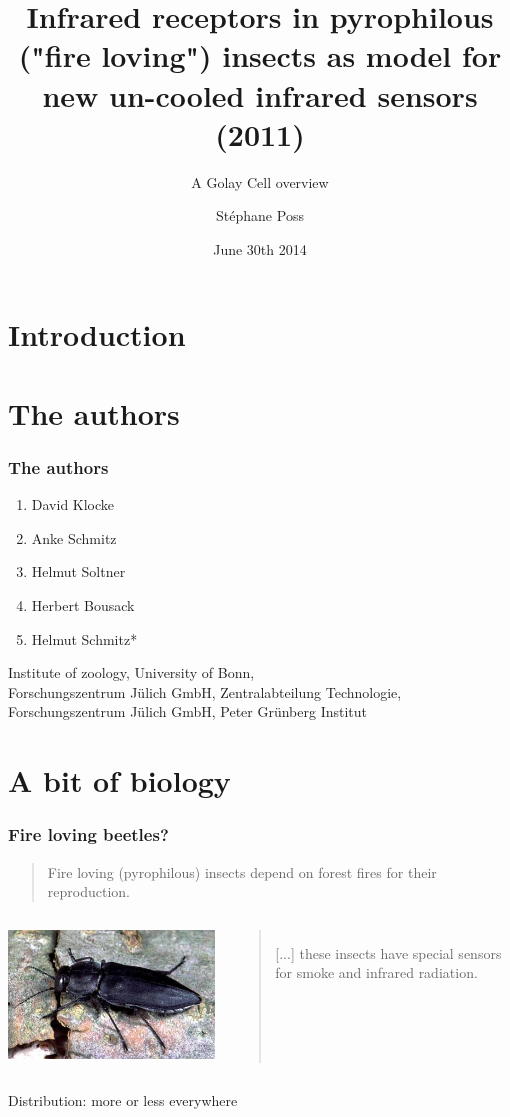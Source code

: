 \documentclass[14pt]{beamer}
\title{Infrared receptors in pyrophilous\\ ("fire loving") insects as model for new un-cooled infrared sensors (2011)}
\subtitle{A Golay Cell overview}
\author{St\'ephane Poss}
\date{June 30th 2014}
\begin{document}
\begin{frame}[plain]
\titlepage
\end{frame}

\section{Introduction}

\begin{frame}
\tableofcontents
\end{frame}

\section{The authors}
\begin{frame}
\frametitle{The authors}
\begin{enumerate}
\item David Klocke
\item Anke Schmitz
\item Helmut Soltner
\item Herbert Bousack
\item Helmut Schmitz*
\end{enumerate}
Institute of zoology, University of Bonn,\\
Forschungszentrum J\"ulich GmbH, Zentralabteilung Technologie,\\
Forschungszentrum J\"ulich GmbH, Peter Gr\"unberg Institut
\end{frame}

\section{A bit of biology}
\begin{frame}
\frametitle{Fire loving beetles?}
\begin{quote}
Fire loving (pyrophilous) insects depend on forest fires for their reproduction.
\end{quote}
\begin{columns}
\includegraphics[width=\textwidth]{kaefer_03.jpg}
\begin{quote}
[...] these insects have special sensors for smoke and infrared radiation.
\end{quote}
\end{columns}
Distribution: more or less everywhere
\end{frame}
\end{document}
